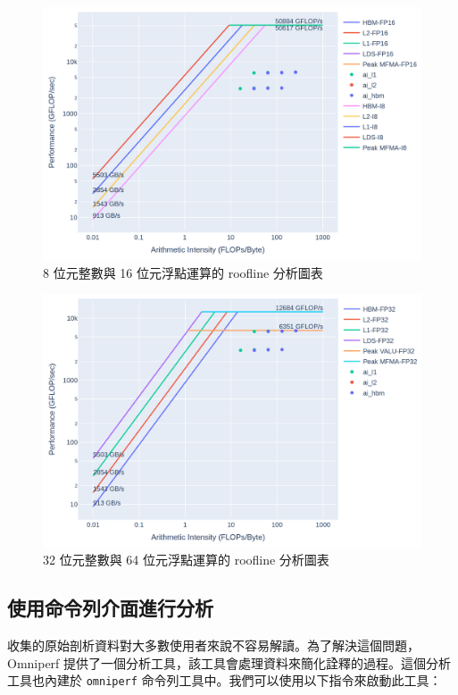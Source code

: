 \begin{figure}
    \centering
    \includegraphics[width=1\linewidth]{Appendici/Roofline1.png}
    \caption{8 位元整數與 16 位元浮點運算的 roofline 分析圖表}
    \label{fig:roofline1}
\end{figure}

\begin{figure}
    \centering
    \includegraphics[width=1\linewidth]{Appendici/Roofline2.png}
    \caption{32 位元整數與 64 位元浮點運算的 roofline 分析圖表}
    \label{fig:roofline2}
\end{figure}

\subsection{使用命令列介面進行分析}
收集的原始剖析資料對大多數使用者來說不容易解讀。為了解決這個問題，Omniperf 提供了一個分析工具，該工具會處理資料來簡化詮釋的過程。這個分析工具也內建於 \lstinline|omniperf| 命令列工具中。我們可以使用以下指令來啟動此工具：

